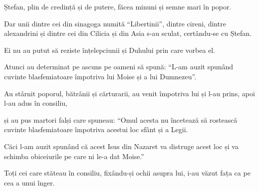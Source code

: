 {\par }{\PP {}Ștefan, plin de credință și de putere, făcea minuni și semne mari în popor.

Dar unii dintre cei din sinagoga numită “Libertinii”, dintre cireni, dintre alexandrini și dintre cei din Cilicia și din Asia s-au sculat, certându-se cu Ștefan.

Ei nu au putut să reziste înțelepciunii și Duhului prin care vorbea el.

Atunci au determinat pe ascuns pe oameni să spună: “L-am auzit spunând cuvinte blasfemiatoare împotriva lui Moise și a lui Dumnezeu”.

Au stârnit poporul, bătrânii și cărturarii, au venit împotriva lui și l-au prins, apoi l-au adus în consiliu,

și au pus martori falși care spuneau: “Omul acesta nu încetează să rostească cuvinte blasfemiatoare împotriva acestui loc sfânt și a Legii.

Căci l-am auzit spunând că acest Isus din Nazaret va distruge acest loc și va schimba obiceiurile pe care ni le-a dat Moise.”

Toți cei care stăteau în consiliu, fixându-și ochii asupra lui, i-au văzut fața ca pe cea a unui înger.



\par }
